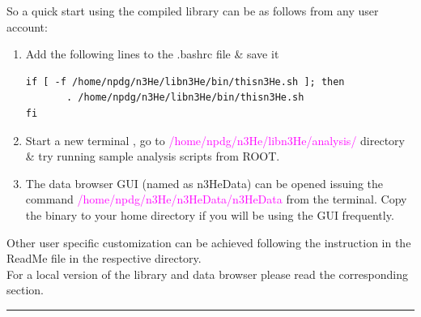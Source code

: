 \documentclass[12pt]{article}
\begin{document}
So a quick start using the compiled library can be as follows from any user account:

\begin{enumerate}
  \item Add the following lines to the .bashrc file \& save it
 
\begin{lstlisting}
if [ -f /home/npdg/n3He/libn3He/bin/thisn3He.sh ]; then
       . /home/npdg/n3He/libn3He/bin/thisn3He.sh
fi
\end{lstlisting}

 \item Start a new terminal , go to  \textcolor{magenta} { /home/npdg/n3He/libn3He/analysis/ }directory \& try running sample analysis scripts from ROOT.
 \item The data browser GUI (named as n3HeData) can be opened issuing the command\textcolor{magenta}{ /home/npdg/n3He/n3HeData/n3HeData } from the terminal. Copy the binary to your home directory if you will be using the GUI frequently.
\end{enumerate}

Other user specific customization can be achieved following the instruction in the ReadMe file in the respective directory.\\
For a local version of the library and data browser please read the corresponding section.

\noindent
{\color{red} \rule{\linewidth}{1mm} }
 
\newpage
\end{document}
